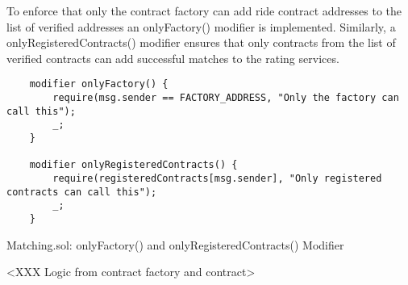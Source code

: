 To enforce that only the contract factory can add ride contract addresses to the list of verified addresses an onlyFactory() modifier is implemented. Similarly, a onlyRegisteredContracts() modifier ensures that only contracts from the list of verified contracts can add successful matches to the rating services.

\lstset{
  basicstyle=\footnotesize\ttfamily,
  breaklines=true,
  numbers=left,
  firstnumber=24
}

\begin{Listing}
\begin{lstlisting}
    modifier onlyFactory() {
        require(msg.sender == FACTORY_ADDRESS, "Only the factory can call this");
        _;
    }

    modifier onlyRegisteredContracts() {
        require(registeredContracts[msg.sender], "Only registered contracts can call this");
        _;
    }
\end{lstlisting}
  \caption{Matching.sol: onlyFactory() and onlyRegisteredContracts() Modifier}
  \label{lst:modifier}
\end{Listing}


<XXX Logic from contract factory and contract>




